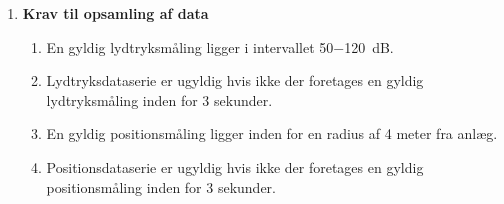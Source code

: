 \begin{enumerate}
\item \textbf{Krav til opsamling af data}
	\begin{enumerate}[label*=\arabic*.]
	\item En gyldig lydtryksmåling ligger i intervallet 50$-$\SI{120}{dB}.
	\item Lydtryksdataserie er ugyldig hvis ikke der foretages en gyldig lydtryksmåling inden for 3 sekunder.
	\item En gyldig positionsmåling ligger inden for en radius af 4 meter fra anlæg. 
	\item Positionsdataserie er ugyldig hvis ikke der foretages en gyldig positionsmåling inden for 3 sekunder.\\
	\end{enumerate}
\end{enumerate}
